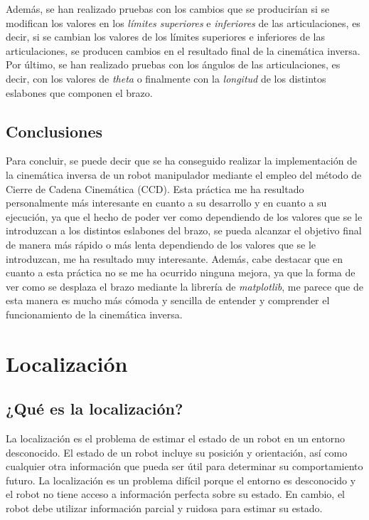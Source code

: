 \documentclass[11pt]{report}
\begin{document}
Además, se han realizado pruebas con los cambios que se producirían si se modifican los valores en los \emph{límites superiores} e \emph{inferiores} de las articulaciones, es decir, si se cambian los valores de los límites superiores e inferiores de las articulaciones, se producen cambios en el resultado final de la cinemática inversa. Por último, se han realizado pruebas con los ángulos de las articulaciones, es decir, con los valores de \emph{theta} o finalmente con la \emph{longitud} de los distintos eslabones que componen el brazo.

\section{Conclusiones}

Para concluir, se puede decir que se ha conseguido realizar la implementación de la cinemática inversa de un robot manipulador mediante el empleo del método de Cierre de Cadena Cinemática (CCD). Esta práctica me ha resultado personalmente más interesante en cuanto a su desarrollo y en cuanto a su ejecución, ya que el hecho de poder ver como dependiendo de los valores que se le introduzcan a los distintos eslabones del brazo, se pueda alcanzar el objetivo final de manera más rápido o más lenta dependiendo de los valores que se le introduzcan, me ha resultado muy interesante. Además, cabe destacar que en cuanto a esta práctica no se me ha ocurrido ninguna mejora, ya que la forma de ver como se desplaza el brazo mediante la librería de \emph{matplotlib}, me parece que de esta manera es mucho más cómoda y sencilla de entender y comprender el funcionamiento de la cinemática inversa.

\chapter{Localización}

\section{¿Qué es la localización?}

La localización es el problema de estimar el estado de un robot en un entorno desconocido. El estado de un robot incluye su posición y orientación, así como cualquier otra información que pueda ser útil para determinar su comportamiento futuro. La localización es un problema difícil porque el entorno es desconocido y el robot no tiene acceso a información perfecta sobre su estado. En cambio, el robot debe utilizar información parcial y ruidosa para estimar su estado.
\end{document}
